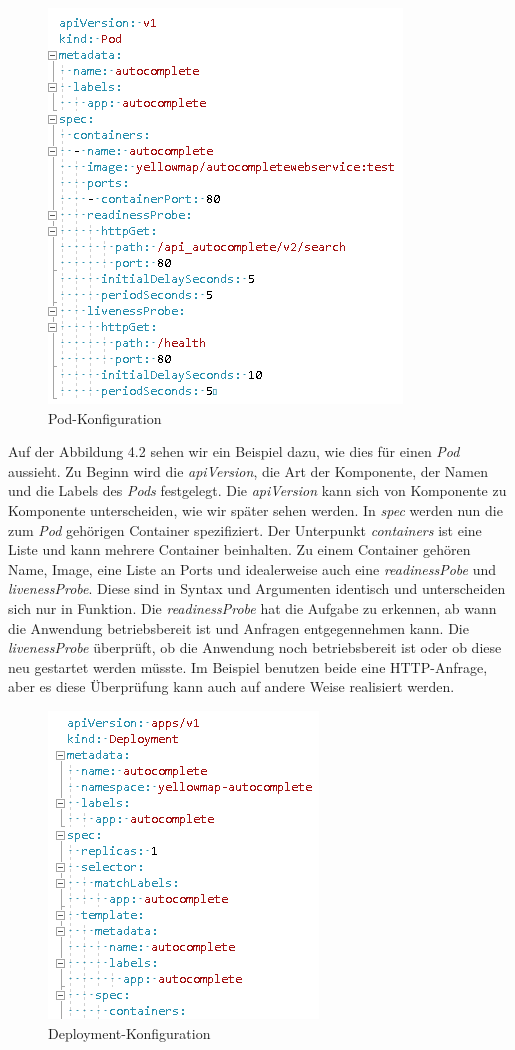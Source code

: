\documentclass[12pt,a4paper]{scrartcl}
\begin{document}
\begin{figure}[h!]
	\centering
	\includegraphics[scale=1]{KubeYmlPod.png}
	\caption[Pod-Konfiguration]{Pod-Konfiguration}
\end{figure}

Auf der Abbildung 4.2 sehen wir ein Beispiel dazu, wie dies für einen \emph{Pod} aussieht. Zu Beginn wird die \emph{apiVersion}, die Art der Komponente, der Namen und die Labels des \emph{Pods} festgelegt. Die \emph{apiVersion} kann sich von Komponente zu Komponente unterscheiden, wie wir später sehen werden. In \emph{spec} werden nun die zum \emph{Pod} gehörigen Container spezifiziert. Der Unterpunkt \emph{containers} ist eine Liste und kann mehrere Container beinhalten. Zu einem Container gehören Name, Image, eine Liste an Ports und idealerweise auch eine \emph{readinessPobe} und \emph{livenessProbe}. Diese sind in Syntax und Argumenten identisch und unterscheiden sich nur in Funktion. Die \emph{readinessProbe} hat die Aufgabe zu erkennen, ab wann die Anwendung betriebsbereit ist und Anfragen entgegennehmen kann. Die \emph{livenessProbe} überprüft, ob die Anwendung noch betriebsbereit ist oder ob diese neu gestartet werden müsste. Im Beispiel benutzen beide eine HTTP-Anfrage, aber es diese Überprüfung kann auch auf andere Weise realisiert werden.\cite{k8sRlp}

\begin{figure}[h!]
	\centering
	\includegraphics[scale=1]{KubeYmlDep.png}
	\caption[Deployment-Konfiguration]{Deployment-Konfiguration}
\end{figure}
\end{document}
